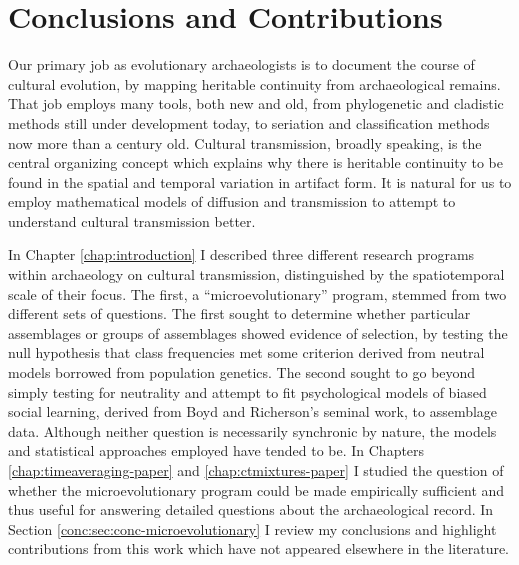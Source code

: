 
\section{Conclusions and Contributions}\label{conc:sec:research-conclusions}

Our primary job as evolutionary archaeologists is to document the course of cultural evolution, by mapping heritable continuity from archaeological remains.  That job employs many tools, both new and old, from phylogenetic and cladistic methods still under development today, to seriation and classification methods now more than a century old.  Cultural transmission, broadly speaking, is the central organizing concept which explains why there is heritable continuity to be found in the spatial and temporal variation in artifact form.  It is natural for us to employ mathematical models of diffusion and transmission to attempt to understand cultural transmission better.  

In Chapter \ref{chap:introduction} I described three different research programs within archaeology on cultural transmission, distinguished by the spatiotemporal scale of their focus.  The first, a ``microevolutionary'' program, stemmed from two different sets of questions.  The first sought to determine whether particular assemblages or groups of assemblages showed evidence of selection, by testing the null hypothesis that class frequencies met some criterion derived from neutral models borrowed from population genetics.  The second sought to go beyond simply testing for neutrality and attempt to fit psychological models of biased social learning, derived from Boyd and Richerson's seminal work, to assemblage data.  Although neither question is necessarily synchronic by nature, the models and statistical approaches employed have tended to be.  In Chapters \ref{chap:timeaveraging-paper} and \ref{chap:ctmixtures-paper} I studied the question of whether the microevolutionary program could be made empirically sufficient and thus useful for answering detailed questions about the archaeological record.  In Section \ref{conc:sec:conc-microevolutionary} I review my conclusions and highlight contributions from this work which have not appeared elsewhere in the literature.

